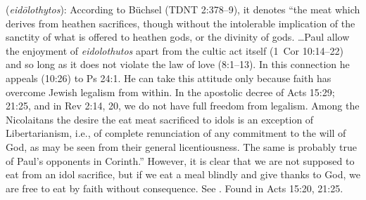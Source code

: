\item[Idol meat,]

(\textit{eidōlothytos}):
According to Büchsel (TDNT 2:378--9), it denotes ``the meat which derives from heathen sacrifices, though without the intolerable implication of the sanctity of what is offered to heathen gods, or the divinity of gods. \ldots Paul allow the enjoyment of \emph{eidolothutos} apart from the cultic act itself (1~Cor 10:14--22) and so long as it does not violate the law of love (8:1--13). In this connection he appeals (10:26) to Ps 24:1. He can take this attitude only because faith has overcome Jewish legalism from within. In the apostolic decree of Acts 15:29; 21:25, and in Rev 2:14, 20, we do not have full freedom from legalism. Among the Nicolaitans the desire the eat meat sacrificed to idols is an exception of Libertarianism, i.e., of complete renunciation of any commitment to the will of God, as may be seen from their general licentiousness. The same is probably true of Paul's opponents in Corinth.'' However, it is clear that we are not supposed to eat from an idol sacrifice, but if we eat a meal blindly and give thanks to God, we are free to eat by faith without consequence. See .
Found in Acts 15:20, 21:25.
